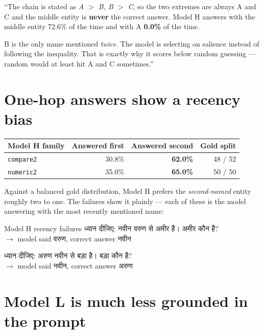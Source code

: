 \documentclass[11pt]{report}
\newcommand{\dn}[1]{{\devanagarifont #1}}
\newcommand{\p}[1]{\texttt{#1}}
\begin{document}
\begin{saybox}
``The chain is stated as \emph{A $>$ B, B $>$ C}, so the two extremes are always
A and C and the middle entity is \textbf{never} the correct answer. Model H
answers with the middle entity 72.6\% of the time and with A \textbf{0.0\%} of
the time.

B is the only name mentioned \emph{twice}. The model is selecting on salience
instead of following the inequality. That is exactly why it scores below random
guessing --- random would at least hit A and C sometimes.''
\end{saybox}

\section{One-hop answers show a recency bias}

\begin{center}
\begin{tabular}{@{}lrrr@{}}
\toprule
\textbf{Model H family} & \textbf{Answered first} & \textbf{Answered second} & \textbf{Gold split} \\
\midrule
\p{compare2} & 30.8\% & \textbf{62.0\%} & 48 / 52 \\
\p{numeric2} & 35.0\% & \textbf{65.0\%} & 50 / 50 \\
\bottomrule
\end{tabular}
\end{center}

Against a balanced gold distribution, Model H prefers the \emph{second-named}
entity roughly two to one. The failures show it plainly --- each of these is the
model answering with the most recently mentioned name:

\begin{example}{Model H recency failures}
\dn{ध्यान दीजिए: नवीन वरुण से अमीर है। अमीर कौन है?} \\
$\rightarrow$ model said \dn{वरुण}, correct answer \dn{नवीन}

\medskip
\dn{ध्यान दीजिए: अरुण नवीन से बड़ा है। बड़ा कौन है?} \\
$\rightarrow$ model said \dn{नवीन}, correct answer \dn{अरुण}
\end{example}

\section{Model L is much less grounded in the prompt}
\label{sec:offprompt}
\end{document}
